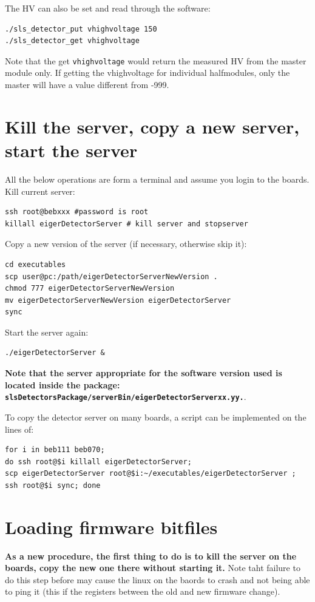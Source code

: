 \documentclass{article}
\begin{document}
The HV can also be set and read through the software:
\begin{verbatim}
./sls_detector_put vhighvoltage 150
./sls_detector_get vhighvoltage 
\end{verbatim}
Note that the get {\tt{vhighvoltage}} would return the measured HV from the master module only. If getting the vhighvoltage for individual halfmodules, only the master will have a value different from -999.

\appendix

\section{Kill the server, copy a new server, start the server}\label{server}
All the below operations are form a terminal and assume you login to the boards.\\
Kill current server:
\begin{verbatim}
ssh root@bebxxx #password is root
killall eigerDetectorServer # kill server and stopserver
\end{verbatim}
Copy a new version of the server (if necessary, otherwise skip it):
\begin{verbatim}
cd executables
scp user@pc:/path/eigerDetectorServerNewVersion .
chmod 777 eigerDetectorServerNewVersion
mv eigerDetectorServerNewVersion eigerDetectorServer
sync
\end{verbatim}
Start the server again:
\begin{verbatim}
./eigerDetectorServer &
\end{verbatim}
\textbf{Note that the server appropriate for the software version used is located inside the package: {\tt{slsDetectorsPackage/serverBin/eigerDetectorServerxx.yy.}}}.

To copy the detector server on many boards, a script can be implemented on the lines of:
\begin{verbatim}
for i in beb111 beb070; 
do ssh root@$i killall eigerDetectorServer; 
scp eigerDetectorServer root@$i:~/executables/eigerDetectorServer ; 
ssh root@$i sync; done
\end{verbatim}

\section{Loading firmware bitfiles}

\textbf{As a new procedure, the first thing to do is to kill the server on the boards, copy the new one there without starting it.} Note taht failure to do this step before may cause the linux on the baords to crash and not being able to ping it (this if the registers between the old and new firmware change).
\end{document}
